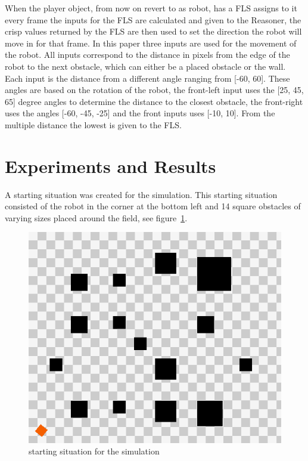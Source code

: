 \documentclass[conference]{IEEEtran}
\begin{document}
When the player object, from now on revert to as robot, has a FLS assigns to it every frame the inputs for the FLS are calculated and given to the Reasoner, the crisp values returned by the FLS are then used to set the direction the robot will move in for that frame. In this paper three inputs are used for the movement of the robot. All inputs correspond to the distance in pixels from the edge of the robot to the next obstacle, which can either be a placed obstacle or the wall. Each input is the distance from a different angle ranging from [-60, 60]. These angles are based on the rotation of the robot, the front-left input uses the [25, 45, 65] degree angles to determine the distance to the closest obstacle, the front-right uses the angles [-60, -45, -25] and the front inputs uses [-10, 10]. From the multiple distance the lowest is given to the FLS. %

\section{Experiments and Results}
A starting situation was created for the simulation. This starting situation consisted of the robot in the corner at the bottom left and 14 square obstacles of varying sizes placed around the field, see figure~\ref{fig:start}.

\begin{figure}[!ht]
  \centering
  \includegraphics[scale=0.3]{./figs/StartSetup.png}
  \caption{starting situation for the simulation}
  \label{fig:start}
\end{figure}
\end{document}
